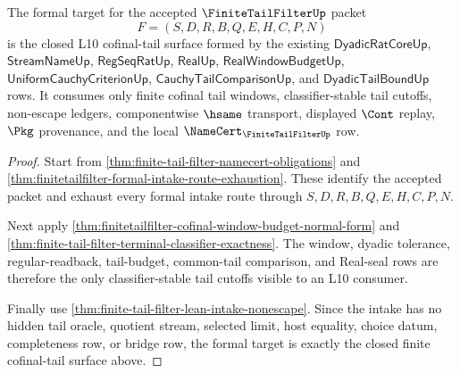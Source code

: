 \begin{theorem}
\label{thm:finite-tail-filter-formal-target-route-closure}
The formal target for the accepted $\FiniteTailFilterUp$ packet
$$
F=(S,D,R,B,Q,E,H,C,P,N)
$$
is the closed L10 cofinal-tail surface formed by the existing $\mathsf{DyadicRatCoreUp}$, $\mathsf{StreamNameUp}$, $\mathsf{RegSeqRatUp}$, $\mathsf{RealUp}$, $\mathsf{RealWindowBudgetUp}$, $\mathsf{UniformCauchyCriterionUp}$, $\mathsf{CauchyTailComparisonUp}$, and $\mathsf{DyadicTailBoundUp}$ rows. It consumes only finite cofinal tail windows, classifier-stable tail cutoffs, non-escape ledgers, componentwise $\hsame$ transport, displayed $\Cont$ replay, $\Pkg$ provenance, and the local $\NameCert_{\FiniteTailFilterUp}$ row.
\end{theorem}
\begin{proof}
Start from \autoref{thm:finite-tail-filter-namecert-obligations} and \autoref{thm:finitetailfilter-formal-intake-route-exhaustion}. These identify the accepted packet and exhaust every formal intake route through $S,D,R,B,Q,E,H,C,P,N$.

Next apply \autoref{thm:finitetailfilter-cofinal-window-budget-normal-form} and \autoref{thm:finite-tail-filter-terminal-classifier-exactness}. The window, dyadic tolerance, regular-readback, tail-budget, common-tail comparison, and Real-seal rows are therefore the only classifier-stable tail cutoffs visible to an L10 consumer.

Finally use \autoref{thm:finite-tail-filter-lean-intake-nonescape}. Since the intake has no hidden tail oracle, quotient stream, selected limit, host equality, choice datum, completeness row, or bridge row, the formal target is exactly the closed finite cofinal-tail surface above.
\end{proof}

